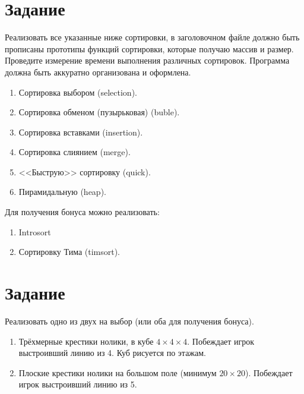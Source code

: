 \documentclass[12pt]{article}
\begin{document}
\section{Задание}

Реализовать все указанные ниже сортировки, в заголовочном файле должно быть прописаны прототипы функций сортировки,
которые получаю массив и размер. Проведите измерение времени выполнения различных сортировок. Программа должна быть
аккуратно организована и оформлена.

\begin{enumerate}
 \item Сортировка выбором (selection).
 \item Сортировка обменом (пузырьковая) (buble).
 \item Сортировка вставками (insertion).
 \item Сортировка слиянием (merge).
 \item <<Быструю>> сортировку (quick).
 \item Пирамидальную (heap).
\end{enumerate}

Для получения бонуса можно реализовать:

\begin{enumerate}
 \item Introsort
 \item Сортировку Тима (timsort).
\end{enumerate}

\section{Задание}

Реализовать одно из двух на выбор (или оба для получения бонуса).

\begin{enumerate}
 \item Трёхмерные крестики нолики, в кубе $4\times 4 \times 4$. Побеждает игрок выстроивший линию из 4. Куб рисуется по
этажам.
 \item Плоские крестики нолики на большом поле (минимум $20 \times 20$). Побеждает игрок выстроивший линию из 5.
\end{enumerate}
\end{document}
